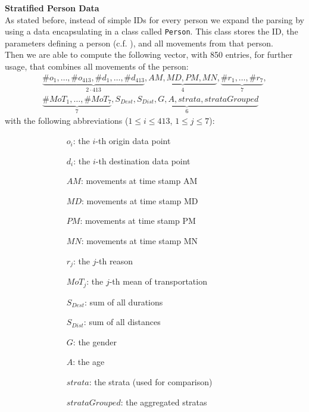 	\textbf{Stratified Person Data}\label{subsubsec: person vector data}\\
	As stated before, instead of simple IDs for every person we expand the parsing by using a data encapsulating in a class called \texttt{Person}. This class stores the ID, the parameters defining a person (c.f. ), and all movements from that person.\\
	Then we are able to compute the following vector, with 850 entries, for further usage, that combines all movements of the person:
	\begin{align*}
	\underbrace{\#o_1, \dots, \#o_{413}, \#d_1, \dots, \#d_{413}}_{2\cdot 413} ,
	\underbrace{\mathit{AM}, \mathit{MD}, \mathit{PM}, \mathit{MN}}_{4}, 
	\underbrace{\#r_1, \dots, \#r_7}_{7}, \\
	\underbrace{\#\mathit{MoT}_1, \dots, \#\mathit{MoT}_7}_{7}, \underbrace{\mathit{S_{Dest}}, \mathit{S_{Dist}}, \mathit{G}, \mathit{A} ,\mathit{strata}, \mathit{strataGrouped}}_{6}
	\end{align*}
	with the following abbreviations ($1 \le i \le 413$, $1 \le j \le 7$):
	\begin{figure}[H]
		\centering
		\hspace*{-.3cm}
		\begin{subfigure}{0.50\textwidth}
		\begin{itemize}
			\setlength{\itemindent}{.4cm}
			\item[$o_i$:]  the $i$-th origin data point
			\item[$d_i$:]  the $i$-th destination data point
			\item[$\mathit{AM}$:] movements at time stamp AM
			\item[$\mathit{MD}$:] movements at time stamp MD
			\item[$\mathit{PM}$:] movements at time stamp PM
			\item[$\mathit{MN}$:] movements at time stamp MN
			\item[$r_j$:] the $j$-th reason
		\end{itemize}
	\end{subfigure}\hspace*{1cm}
	\begin{subfigure}{0.48\textwidth}
	\begin{itemize}
			\item[$\mathit{MoT}_j$:] the $j$-th mean of transportation
			\item[$\mathit{S_{Dest}}$:] sum of all durations
			\item[$\mathit{S_{Dist}}$:] sum of all distances
			\item[$\mathit{G}$:] the gender
			\item[$\mathit{A}$:] the age
			\item[$strata$:] the strata (used for comparison)
			\item[$strataGrouped$:] the aggregated stratas
		\end{itemize}
	\end{subfigure}
	\end{figure}

